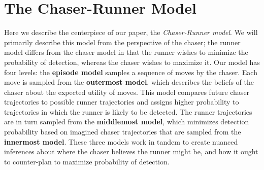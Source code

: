 \documentclass[twoside]{article}
\begin{document}

\section{The Chaser-Runner Model}


\label{sec:tcrm}

Here we describe the centerpiece of our paper, the \emph{Chaser-Runner model}.  We will primarily describe this model from the perspective
of the chaser; the runner model differs from the chaser model in that
the runner wishes to minimize the probability of detection, whereas the chaser wishes to maximize it.
Our model has four levels: the \textbf{episode model} samples a sequence of moves by the chaser. Each move is sampled from the \textbf{outermost model}, which describes the
beliefs of the chaser about the expected utility of moves. This model compares future chaser trajectories to possible runner trajectories and assigns higher probability to trajectories in which the runner is likely to be detected. The runner trajectories are in turn sampled from the  \textbf{middlemost model}, which minimizes detection probability based on imagined chaser trajectories that are sampled from the \textbf{innermost model}.
%
These three models work in tandem to create nuanced inferences about
where the chaser believes the runner might be, and how it ought to 
counter-plan to maximize probability of detection.
\end{document}
